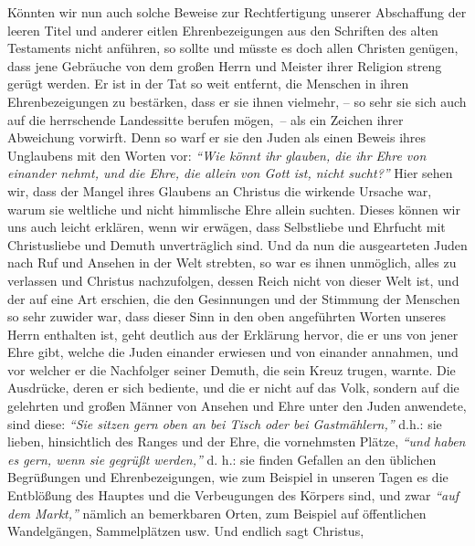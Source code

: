 Könnten wir nun auch solche Beweise zur Rechtfertigung unserer Abschaffung der
leeren Titel und anderer eitlen Ehrenbezeigungen aus den Schriften des alten
Testaments nicht anführen, so sollte und müsste es doch allen Christen genügen,
dass jene Gebräuche von dem großen Herrn und Meister ihrer Religion streng
gerügt
werden. Er ist in der Tat so weit entfernt, die Menschen in ihren
Ehrenbezeigungen zu bestärken, dass er sie ihnen vielmehr, -- so sehr sie sich
auch auf die herrschende Landessitte berufen mögen,~-- als ein Zeichen ihrer
Abweichung vorwirft. Denn so warf er sie den Juden als einen Beweis ihres
Unglaubens mit den Worten vor:
\textit{"`Wie könnt ihr glauben, die ihr Ehre von einander
nehmt, und die Ehre, die allein von Gott ist, nicht sucht?"'}
Hier sehen wir, dass der Mangel ihres Glaubens an Christus die wirkende
Ursache war, warum sie weltliche und nicht himmlische Ehre allein suchten.
Dieses können wir uns auch leicht erklären, wenn wir erwägen, dass Selbstliebe
und Ehrfucht mit Christusliebe und Demuth unverträglich sind. Und da nun die
ausgearteten Juden nach Ruf und Ansehen in der Welt strebten, so war es ihnen
unmöglich, alles zu verlassen und Christus nachzufolgen, dessen
Reich nicht von
dieser Welt ist, und der auf eine Art erschien, die den Gesinnungen und der
Stimmung der Menschen so sehr zuwider war, dass dieser Sinn in den oben
angeführten Worten unseres Herrn enthalten ist, geht deutlich aus der Erklärung
hervor, die er uns von jener Ehre gibt, welche die Juden
einander erwiesen und
von einander annahmen, und vor welcher er die Nachfolger seiner Demuth, die sein
Kreuz trugen, warnte. Die Ausdrücke, deren er sich bediente,
und die er nicht
auf das Volk, sondern auf die gelehrten und großen Männer von Ansehen und Ehre
unter den Juden anwendete, sind diese:
\textit{"`Sie sitzen gern oben an bei Tisch
oder bei Gastmählern,"'}
d.h.: sie lieben, hinsichtlich des
Ranges und der Ehre, die vornehmsten Plätze,
\textit{"`und haben es gern, wenn sie gegrüßt werden,"'}
d. h.: sie
finden Gefallen an den üblichen Begrüßungen und Ehrenbezeigungen, wie zum
Beispiel in
unseren Tagen es die Entblößung des Hauptes und die Verbeugungen des Körpers
sind,
und zwar \textit{"`auf dem Markt,"'} nämlich an bemerkbaren Orten, zum Beispiel
auf
öffentlichen Wandelgängen, Sammelplätzen usw. Und endlich sagt Christus,

